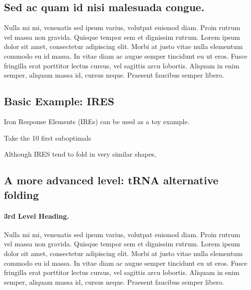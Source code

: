 \documentclass[10pt,letterpaper]{article}
\begin{document}
\subsection*{Sed ac quam id nisi malesuada congue.}

Nulla mi mi, venenatis sed ipsum varius, volutpat euismod diam. Proin rutrum vel massa non gravida. Quisque tempor sem et dignissim rutrum. Lorem ipsum dolor sit amet, consectetur adipiscing elit. Morbi at justo vitae nulla elementum commodo eu id massa. In vitae diam ac augue semper tincidunt eu ut eros. Fusce fringilla erat porttitor lectus cursus, vel sagittis arcu lobortis. Aliquam in enim semper, aliquam massa id, cursus neque. Praesent faucibus semper libero.

\subsection*{Basic Example: IRES}

Iron Response Elements (IREs) can be used as a toy example.

Take the 10 first suboptimals

 
Although IRES tend to fold in very similar shapes, 

\subsection*{A more advanced level: tRNA alternative folding}
\paragraph{3rd Level Heading.} Nulla mi mi, venenatis sed ipsum varius, volutpat euismod diam. Proin rutrum vel massa non gravida. Quisque tempor sem et dignissim rutrum. Lorem ipsum dolor sit amet, consectetur adipiscing elit. Morbi at justo vitae nulla elementum commodo eu id massa. In vitae diam ac augue semper tincidunt eu ut eros. Fusce fringilla erat porttitor lectus cursus, vel sagittis arcu lobortis. Aliquam in enim semper, aliquam massa id, cursus neque. Praesent faucibus semper libero.
\end{document}
